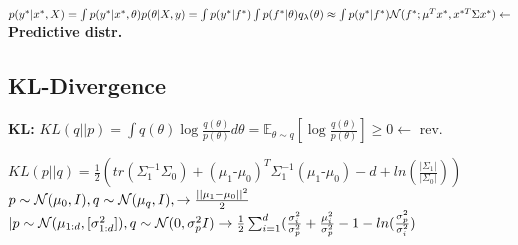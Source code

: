 $p(y^*|x^*,X) = \int p(y^*|x^*,\theta)p(\theta|X,y) 
= \int p(y^*|f^*)\int p(f^*|\theta)q_\lambda(\theta)\\
\approx \int p(y^*|f^*) \mathcal{N}(f^*; \mu^Tx^*, x^{*T}\Sigma x^*) \leftarrow$ \textbf{Predictive distr.}\\
\begin{comment}
	\textbf{Problems:} It greedily seeks mode, then matches the curvature. 
	This can lead to bad approximations, if the function is imbalanced.\\
\end{comment}

\subsection{KL-Divergence}
\textbf{KL:} $KL(q||p) = \int q(\theta) \log \frac{q(\theta)}{p(\theta)} d\theta = \mathbb{E}_{\theta \sim q}[\log\frac{q(\theta)}{p(\theta)}]\geq 0 \leftarrow$ rev.\\
\begin{comment}
	\textbf{Variational Familiy:} We want a family of "simple" distributions to use for approximation, such as Gaussian or diagonal Gaussians.\\
	\textbf{Intuition:} The more p and q agree, the lower the divergence is. If it is zero, they agree almost everywhere. \\
	\textbf{Symmetry:} In general not symmetric, can't switch p and q\\
	\textbf{Backwards KL:} $KL(q||p)$ is a mode seeker, since it lets us choose where we want to put q. \\
	\textbf{Forward KL:} Tries that q is not small where some probability mass of p is, since the fraction would drive the divergence up. It is more inclusive, usually wider, but harder to compute.\\
\end{comment}

$KL(p||q) = \frac{1}{2}(tr(\Sigma_1^{-1}\Sigma_0) + (\mu_1 \text{-} \mu_0)^T \Sigma_1^{-1} (\mu_1 \text{-} \mu_0) - d + ln(\frac{|\Sigma_1|}{|\Sigma_0|}))$\\
$p\sim \mathcal{N}(\mu_0, I), q\sim \mathcal{N}(\mu_q, I),\rightarrow \frac{||\mu_1 - \mu_0||^2}{2}$
$| p\sim \mathcal{N}(\mu_{1:d}, [\sigma_{1:d}^2]),\\ q\sim \mathcal{N}(0, \sigma_p^2 I) \rightarrow \frac{1}{2} \sum_{i=1}^d (\frac{\sigma_i^2}{\sigma_p	^2} + \frac{\mu_i^2}{\sigma^2_p} - 1 - ln(\frac{\sigma_p^2}{\sigma_i	^2})$
\begin{comment}
	\textbf{Gaussian cases:} These special cases are for Standart Normal Gaussians and diagonal Gaussian cases.\\
\end{comment}

